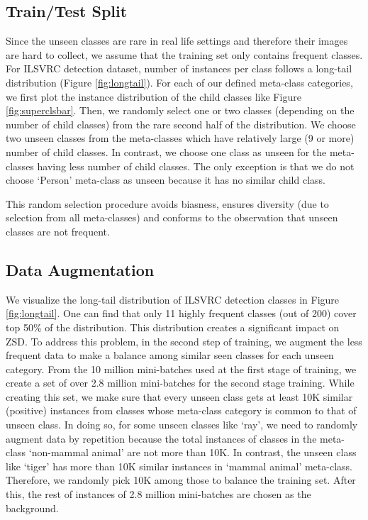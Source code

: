 \documentclass[runningheads]{llncs}
\begin{document}
\subsection{Train/Test Split}\label{sec:split}
Since the unseen classes are rare in real life settings and therefore their images are hard to collect, we assume that the training set only contains frequent classes. 
For ILSVRC detection dataset, number of instances per class follows a long-tail distribution (Figure \ref{fig:longtail}). For each of our defined meta-class categories, we first plot the instance distribution of the child classes like Figure \ref{fig:superclsbar}. Then, we randomly select one or two classes (depending on the number of child classes) from the rare second half of the distribution. We choose two unseen classes from the meta-classes which have relatively large (9 or more) number of child classes. In contrast, we choose one class as unseen for the meta-classes having less number of child classes. The only exception is that we do not choose `Person' meta-class as unseen because it has no similar child class.

This random selection procedure avoids biasness, ensures diversity (due to selection from all meta-classes) and conforms to the observation that unseen classes are not frequent. 

\subsection{Data Augmentation} \label{sec:augmentation}

We visualize the long-tail distribution of ILSVRC detection classes in Figure \ref{fig:longtail}. One can find that only 11 highly frequent classes (out of 200) cover top 50\% of the distribution. This distribution creates a significant impact on ZSD. To address this problem, in the second step of training, we augment the less frequent data to make a balance among similar seen classes for each unseen category. From the 10 million mini-batches used at the first stage of training, we create a set of over 2.8 million mini-batches for the second stage training. While creating this set, we make sure that every unseen class gets at least 10K similar (positive)  instances from classes whose meta-class category is common to that of unseen class. In doing so, for some unseen classes like `ray', we need to randomly augment data by repetition because the total instances of classes in the meta-class `non-mammal animal' are not more than 10K. In contrast, the unseen class like `tiger' has more than 10K similar instances in `mammal animal' meta-class. Therefore, we randomly pick 10K among those to balance the training set. After this, the rest of instances of 2.8 million mini-batches are chosen as the background.
\end{document}
